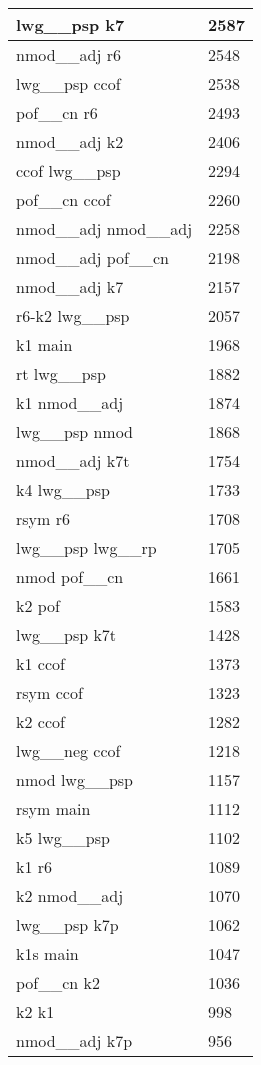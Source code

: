 \documentclass[a4 paper]{article}
\begin{document}
\begin{longtable}{p{}p{}}
lwg\_\_psp k7  & 2587 \\ \midrule
nmod\_\_adj r6  & 2548 \\ \midrule
lwg\_\_psp ccof  & 2538 \\ \midrule
pof\_\_cn r6  & 2493 \\ \midrule
nmod\_\_adj k2  & 2406 \\ \midrule
ccof lwg\_\_psp  & 2294 \\ \midrule
pof\_\_cn ccof  & 2260 \\ \midrule
nmod\_\_adj nmod\_\_adj  & 2258 \\ \midrule
nmod\_\_adj pof\_\_cn  & 2198 \\ \midrule
nmod\_\_adj k7  & 2157 \\ \midrule
r6-k2 lwg\_\_psp  & 2057 \\ \midrule
k1 main  & 1968 \\ \midrule
rt lwg\_\_psp  & 1882 \\ \midrule
k1 nmod\_\_adj  & 1874 \\ \midrule
lwg\_\_psp nmod  & 1868 \\ \midrule
nmod\_\_adj k7t  & 1754 \\ \midrule
k4 lwg\_\_psp  & 1733 \\ \midrule
rsym r6  & 1708 \\ \midrule
lwg\_\_psp lwg\_\_rp  & 1705 \\ \midrule
nmod pof\_\_cn  & 1661 \\ \midrule
k2 pof  & 1583 \\ \midrule
lwg\_\_psp k7t  & 1428 \\ \midrule
k1 ccof  & 1373 \\ \midrule
rsym ccof  & 1323 \\ \midrule
k2 ccof  & 1282 \\ \midrule
lwg\_\_neg ccof  & 1218 \\ \midrule
nmod lwg\_\_psp  & 1157 \\ \midrule
rsym main  & 1112 \\ \midrule
k5 lwg\_\_psp  & 1102 \\ \midrule
k1 r6  & 1089 \\ \midrule
k2 nmod\_\_adj  & 1070 \\ \midrule
lwg\_\_psp k7p  & 1062 \\ \midrule
k1s main  & 1047 \\ \midrule
pof\_\_cn k2  & 1036 \\ \midrule
k2 k1  & 998 \\ \midrule
nmod\_\_adj k7p  & 956 \\ \midrule

\end{longtable}
\end{document}
